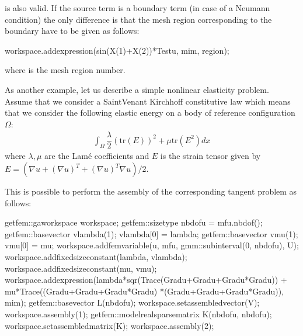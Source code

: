 \documentclass[a4paper,11pt,english]{sphinxmanual}
\begin{document}
is also valid. If the source term is a boundary term (in case of a Neumann condition) the only difference is that the mesh region corresponding to the boundary have to be given as follows:

\begin{sphinxVerbatim}[commandchars=\\\{\}]
workspace.add\PYGZus{}expression(\PYGZdq{}sin(X(1)+X(2))*Test\PYGZus{}u\PYGZdq{}, mim, region);
\end{sphinxVerbatim}

where  is the mesh region number.

As another example, let us describe a simple nonlinear elasticity problem. Assume that we consider a Saint\sphinxhyphen{}Venant Kirchhoff constitutive law which means that we consider the following elastic energy on a body of reference configuration \(\Omega\):
\begin{equation*}
\begin{split}\int_{\Omega} \dfrac{\lambda}{2} (\mbox{tr}(E))^2 + \mu \mbox{tr}(E^2) dx\end{split}
\end{equation*}
where \(\lambda, \mu\) are the Lamé coefficients and  \(E\) is the strain tensor given by \(E = (\nabla u + (\nabla u)^T + (\nabla u)^T\nabla u)/2\).

This is possible to perform the assembly of the corresponding tangent problem as follows:

\begin{sphinxVerbatim}[commandchars=\\\{\}]
getfem::ga\PYGZus{}workspace workspace;
getfem::size\PYGZus{}type nbdofu = mf\PYGZus{}u.nb\PYGZus{}dof();
getfem::base\PYGZus{}vector vlambda(1); vlambda[0] = lambda;
getfem::base\PYGZus{}vector vmu(1); vmu[0] = mu;
workspace.add\PYGZus{}fem\PYGZus{}variable(\PYGZdq{}u\PYGZdq{}, mf\PYGZus{}u, gmm::sub\PYGZus{}interval(0, nbdofu), U);
workspace.add\PYGZus{}fixed\PYGZus{}size\PYGZus{}constant(\PYGZdq{}lambda\PYGZdq{}, vlambda);
workspace.add\PYGZus{}fixed\PYGZus{}size\PYGZus{}constant(\PYGZdq{}mu\PYGZdq{}, vmu);
workspace.add\PYGZus{}expression(\PYGZdq{}lambda*sqr(Trace(Grad\PYGZus{}u+Grad\PYGZus{}u\PYGZsq{}+Grad\PYGZus{}u\PYGZsq{}*Grad\PYGZus{}u))\PYGZdq{}
                         \PYGZdq{}+ mu*Trace((Grad\PYGZus{}u+Grad\PYGZus{}u\PYGZsq{}+Grad\PYGZus{}u\PYGZsq{}*Grad\PYGZus{}u)\PYGZdq{}
                         \PYGZdq{}*(Grad\PYGZus{}u+Grad\PYGZus{}u\PYGZsq{}+Grad\PYGZus{}u\PYGZsq{}*Grad\PYGZus{}u))\PYGZdq{}, mim);
getfem::base\PYGZus{}vector L(nbdofu);
workspace.set\PYGZus{}assembled\PYGZus{}vector(V);
workspace.assembly(1);
getfem::model\PYGZus{}real\PYGZus{}sparse\PYGZus{}matrix K(nbdofu, nbdofu);
workspace.set\PYGZus{}assembled\PYGZus{}matrix(K);
workspace.assembly(2);
\end{sphinxVerbatim}
\end{document}
